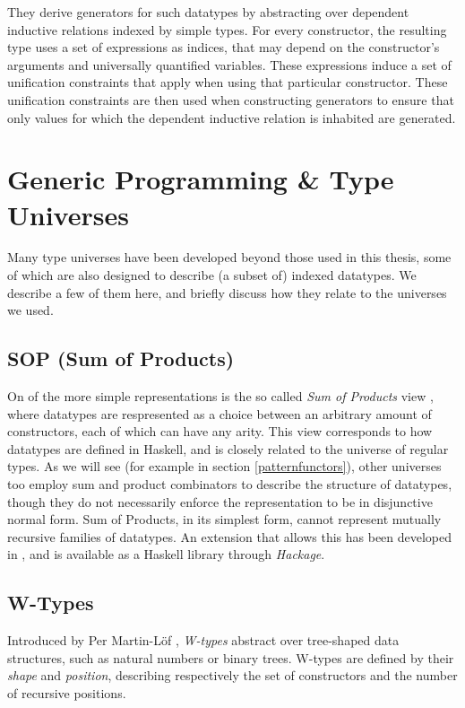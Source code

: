 \documentclass[a4paper,msc,twosized=semi]{uustthesis}
\begin{document}
  They derive generators for such datatypes by abstracting over dependent inductive 
  relations indexed by simple types. For every constructor, the resulting type uses a 
  set of expressions as indices, that may depend on the constructor's arguments and 
  universally quantified variables. These expressions induce a set of unification 
  constraints that apply when using that particular constructor. These unification 
  constraints are then used when constructing generators to ensure that only values 
  for which the dependent inductive relation is inhabited are generated. 

\section{Generic Programming \& Type Universes}\label
{sec:lituniverses}

  Many type universes have been developed beyond those used in this thesis, some of 
  which are also designed to describe (a subset of) indexed datatypes. We describe a 
  few of them here, and briefly discuss how they relate to the universes we used. 

\subsection{SOP (Sum of Products)}\label{sop}

  On of the more simple representations is the so called \textit{Sum of Products} view 
  \cite{de2014true}, where datatypes are respresented as a choice between an arbitrary 
  amount of constructors, each of which can have any arity. This view corresponds to 
  how datatypes are defined in Haskell, and is closely related to the universe of 
  regular types. As we will see (for example in section \ref{patternfunctors}), other 
  universes too employ sum and product combinators to describe the structure of 
  datatypes, though they do not necessarily enforce the representation to be in 
  disjunctive normal form. Sum of Products, in its simplest form, cannot represent 
  mutually recursive families of datatypes. An extension that allows this has been 
  developed in \cite{miraldo2018sums}, and is available as a Haskell library through 
  \emph{Hackage}.  

\subsection{W-Types}\label{sec:wtypes}

  Introduced by Per Martin-Löf \cite{martin1984intuitionistic}, \emph{W-types} 
  abstract over tree-shaped data structures, such as natural numbers or binary trees. 
  W-types are defined by their \emph{shape} and \emph{position}, describing 
  respectively the set of constructors and the number of recursive positions. 
\end{document}
